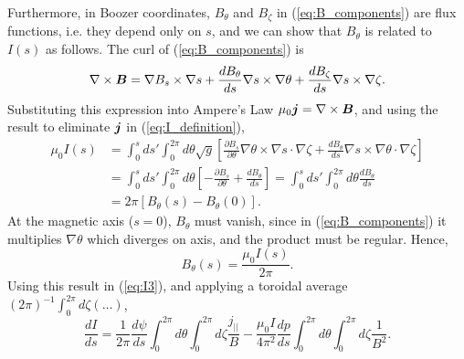 \documentclass[11pt,letter]{article}
\newcommand{\vect}[1]{\mbox{\boldmath $#1$}}
\begin{document}
Furthermore, in Boozer coordinates, $B_\theta$ and $B_\zeta$ in (\ref{eq:B_components})
are flux functions, i.e. they depend only on $s$,
and we can show that $B_\theta$ is related to $I(s)$ as follows.
The curl of (\ref{eq:B_components}) is
\begin{equation}
\nabla\times\vect{B} =\nabla B_s \times \nabla s + \frac{d B_\theta}{ds} \nabla s \times \nabla \theta + \frac{d B_\zeta}{ds} \nabla s \times \nabla\zeta.
\end{equation}
Substituting this expression into Ampere's Law $\mu_0 \vect{j} = \nabla\times\vect{B}$,
and using the result to eliminate $\vect{j}$ in 
(\ref{eq:I_definition}),
\begin{align}
\mu_0 I(s) &= \int_0^{s} ds' \int_0^{2\pi}d\theta \sqrt{g} 
\left[ 
\frac{\partial B_s}{\partial\theta}
\nabla \theta \times \nabla s \cdot\nabla\zeta + \frac{d B_\theta}{ds} \nabla s \times \nabla \theta \cdot\nabla\zeta
\right] \\
&= \int_0^{s} ds' \int_0^{2\pi}d\theta 
\left[ -
\frac{\partial B_s}{\partial\theta}
+ \frac{d B_\theta}{ds} 
\right] = \int_0^{s} ds' \int_0^{2\pi}d\theta 
 \frac{d B_\theta}{ds}  \nonumber \\
 &=2\pi [ B_\theta(s) - B_\theta(0) ]. \nonumber
\end{align}
At the magnetic axis ($s=0$), $B_\theta$ must vanish, since in (\ref{eq:B_components}) it multiplies $\nabla\theta$ which diverges on axis, and the product
must be regular. Hence,
\begin{equation}
B_\theta (s) = \frac{\mu_0 I(s)}{2\pi}.
\end{equation}
Using this result in (\ref{eq:I3}), and applying a toroidal average $(2\pi)^{-1} \int_0^{2\pi} d\zeta (\ldots)$,
\begin{equation}
 \frac{dI}{ds} =
 \frac{1}{2\pi}
\frac{d\psi}{ds}
\int_0^{2\pi}d\theta  \int_0^{2\pi} d\zeta \frac{j_{||}}{B}
-
\frac{\mu_0 I}{4\pi^2}
\frac{dp}{ds} 
\int_0^{2\pi}d\theta  \int_0^{2\pi} d\zeta
 \frac{1}{B^2} .
\label{eq:I4}
\end{equation}
\end{document}
